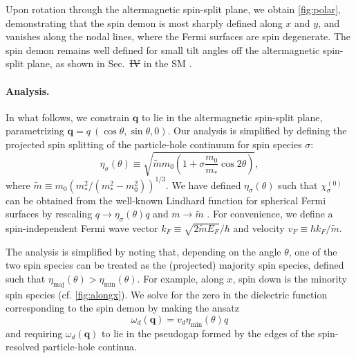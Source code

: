 \documentclass[aps,prl,reprint,twocolumns,superscriptaddress]{revtex4-2}
\newcommand{\mdos}{\tilde{m}}
\newcommand{\kF}{k_{F}}
\newcommand{\vs}{v_d}
\newcommand{\subfigref}[2]{Fig.~\hyperref[#1]{\ref*{#1}#2}}
\providecommand{\DIFaddtex}[1]{{\protect\color{blue}\uwave{#1}}} %
\providecommand{\DIFdeltex}[1]{{\protect\color{red}\sout{#1}}}                      %
\providecommand{\DIFaddbegin}{} %
\providecommand{\DIFaddend}{} %
\providecommand{\DIFdelbegin}{} %
\providecommand{\DIFdelend}{} %
\providecommand{\DIFadd}[1]{\texorpdfstring{\DIFaddtex{#1}}{#1}} %
\providecommand{\DIFdel}[1]{\texorpdfstring{\DIFdeltex{#1}}{}} %
\begin{document}
	
	Upon rotation through the altermagnetic spin-split plane, we obtain \cref{fig:polar}, demonstrating that the spin demon is most sharply defined along $x$ and $y$, and vanishes along the nodal lines, where the Fermi surfaces are spin degenerate. 
	The spin demon remains well defined for small tilt angles off the altermagnetic spin-split plane, as shown in Sec.~\DIFdelbegin \DIFdel{IV }\DIFdelend \DIFaddbegin \DIFadd{VI }\DIFaddend in the SM \cite{Note1}.

	
	
	
	\paragraph{Analysis. }
	In what follows, we constrain $\bm q$ to lie in the altermagnetic spin-split plane, parametrizing $\bm q = q\  (\cos\theta,\sin\theta,0)$. Our analysis is simplified by defining the projected spin splitting of the particle-hole continuum for spin species $\sigma$:
	\begin{equation}
		\eta_{\sigma}(\theta) \equiv \sqrt{\mdos m_0\left( 1+\sigma \frac{m_0}{m_*}\cos2\theta\right)} \label{eq:sigma},
	\end{equation}
	where $\mdos\equiv m_0({m_*^2}/({m_*^2-m_0^2}))^{1/3}$.
	We have defined $\eta_{\sigma}(\theta)$ such that $\chi^{(0)}_\sigma$ can be obtained from the well-known Lindhard function for spherical Fermi surfaces \cite{lindhardPropertiesGasCharged1954,giulianiQuantumTheoryElectron2005} by rescaling $q\rightarrow\eta_\sigma(\theta) q$ and $m\rightarrow \mdos$ \cite{ahnAnisotropicFermionicQuasiparticles2021}. For convenience, we define a spin-independent Fermi wave vector $\kF\equiv\sqrt{2\mdos E_F}/\hbar$ and velocity $v_F\equiv \hbar k_F/\mdos$.

	The analysis is simplified by noting that, depending on the angle $\theta$, one of the two spin species can be treated as the (projected) majority spin species, defined such that $\eta_{{\mathrm{maj}}}(\theta)>\eta_{{\mathrm{min}}}(\theta)$. For example, along $x$, spin down is the minority spin species (cf. \cref{fig:alongx}).
	We solve for the zero in the dielectric function corresponding to the spin demon by making the ansatz \cite{santoroAcousticPlasmonsConducting1988}
	\begin{equation}
		\omega_{d}(\bm q)=\vs \eta_{{\mathrm{min}}}(\theta)q
	\end{equation}
	and requiring $\omega_{d}(\bm q)$ to lie in the pseudogap formed by the edges of the spin-resolved particle-hole continua.
\end{document}
